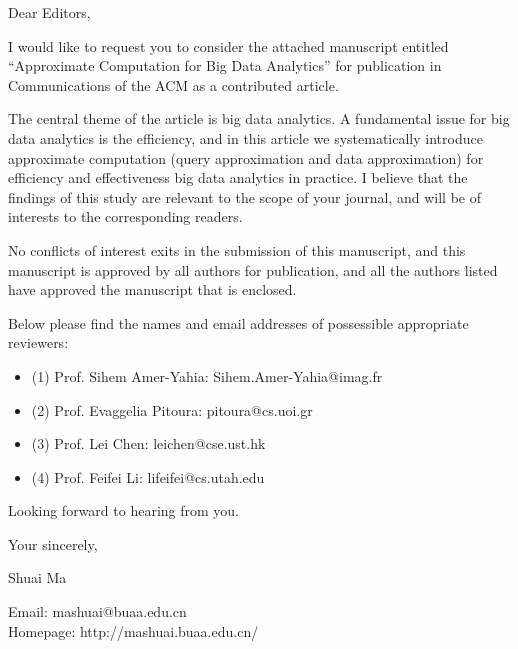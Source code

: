 \documentclass{letter}
\newcommand{\bi}{\begin{itemize}}
\newcommand{\ei}{\end{itemize}}
\begin{document}
Dear Editors,

I would like to request you to consider the attached manuscript entitled ``Approximate Computation for Big Data Analytics'' for publication in Communications of the ACM  as a contributed article.


The central theme of the article is big data analytics. A fundamental issue for big data analytics is the efficiency, and in this article we systematically introduce approximate computation (query approximation and data approximation) for efficiency and effectiveness big data analytics in practice.
I believe that the findings of this study are relevant to the scope of your journal, and will be of interests to the corresponding readers.

No conflicts of interest exits in the submission of this manuscript, and this manuscript is approved by all authors for publication, and  all the authors listed have approved the manuscript that is enclosed.

Below please find the names and email addresses of possessible appropriate reviewers:

\bi
\item[(1)] Prof. Sihem Amer-Yahia: Sihem.Amer-Yahia@imag.fr 

\item[(2)]  Prof. Evaggelia Pitoura: pitoura@cs.uoi.gr

\item[(3)]  Prof. Lei Chen: leichen@cse.ust.hk

\item[(4)]  Prof. Feifei Li: lifeifei@cs.utah.edu
\ei

Looking forward to hearing from you.


Your sincerely,

Shuai Ma


Email: mashuai@buaa.edu.cn\\
Homepage: http://mashuai.buaa.edu.cn/
\end{document}
